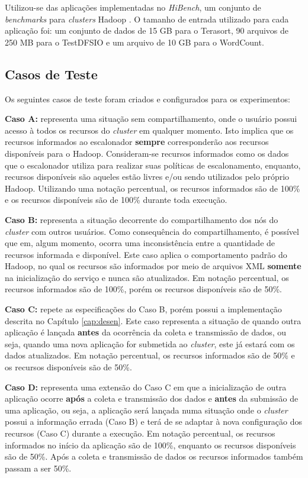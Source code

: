 Utilizou-se das aplicações implementadas no \textit{HiBench}, um conjunto de \textit{benchmarks} para \textit{clusters} Hadoop \cite{HiBench}. O tamanho de entrada utilizado para cada aplicação foi: um conjunto de dados de 15 GB para o Terasort, 90 arquivos de 250 MB para o TestDFSIO e um arquivo de 10 GB para o WordCount. 

\subsection{Casos de Teste}
Os seguintes casos de teste foram criados e configurados para os experimentos:

\textbf{Caso A:} representa uma situação sem compartilhamento, onde o usuário possui acesso à todos os recursos do \textit{cluster} em qualquer momento. Isto implica que os recursos informados ao escalonador \textbf{sempre} corresponderão aos recursos disponíveis para o Hadoop. Consideram-se recursos informados como os dados que o escalonador utiliza para realizar suas políticas de escalonamento, enquanto, recursos disponíveis são aqueles estão livres e/ou sendo utilizados pelo próprio Hadoop. Utilizando uma notação percentual, os recursos informados são de 100\% e os recursos disponíveis são de 100\% durante toda execução.

\textbf{Caso B:} representa a situação decorrente do compartilhamento dos nós do \textit{cluster} com outros usuários. Como consequência do compartilhamento, é possível que em, algum momento, ocorra uma inconsistência entre a quantidade de recursos informada e disponível. Este caso aplica o comportamento padrão do Hadoop, no qual os recursos são informados por meio de arquivos XML \textbf{somente} na inicialização do serviço e nunca são atualizados. Em notação percentual, os recursos informados são de 100\%, porém os recursos disponíveis são de 50\%.

\textbf{Caso C:} repete as especificações do Caso B, porém possui a implementação descrita no Capítulo \ref{cap:desen}. Este caso representa a situação de quando outra aplicação é lançada \textbf{antes} da ocorrência da coleta e transmissão de dados, ou seja, quando uma nova aplicação for submetida ao \textit{cluster}, este já estará com os dados atualizados. Em notação percentual, os recursos informados são de 50\% e os recursos disponíveis são de 50\%.

\textbf{Caso D:} representa uma extensão do Caso C em que a inicialização de outra aplicação ocorre \textbf{após} a coleta e transmissão dos dados e \textbf{antes} da submissão de uma aplicação, ou seja, a aplicação será lançada numa situação onde o \textit{cluster} possui a informação errada (Caso B) e terá de se adaptar à nova configuração dos recursos (Caso C) durante a execução. Em notação percentual, os recursos informados no início da aplicação são de 100\%, enquanto os recursos disponíveis são de 50\%. Após a coleta e transmissão de dados os recursos informados também passam a ser 50\%.

